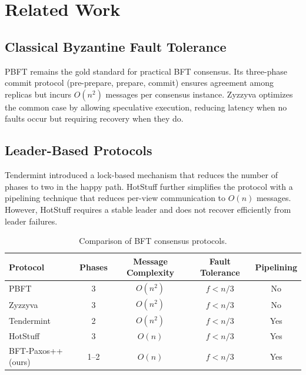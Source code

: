 \documentclass[
    language=english,
    doctype=conference-paper,
    institution=none,
]{../../omnilatex}
\begin{document}
\section{Related Work}
\label{sec:related-work}

\subsection{Classical Byzantine Fault Tolerance}

PBFT \cite{castro1999practical} remains the gold standard for practical BFT consensus.
Its three-phase commit protocol (pre-prepare, prepare, commit) ensures agreement among
replicas but incurs $O(n^2)$ messages per consensus instance. Zyzzyva \cite{kapritsos2012}
optimizes the common case by allowing speculative execution, reducing latency when no faults
occur but requiring recovery when they do.

\subsection{Leader-Based Protocols}

Tendermint \cite{buchman2018tendermint} introduced a lock-based mechanism that reduces
the number of phases to two in the happy path. HotStuff \cite{yin2019hotstuff} further
simplifies the protocol with a pipelining technique that reduces per-view communication
to $O(n)$ messages. However, HotStuff requires a stable leader and does not recover
efficiently from leader failures.

\begin{table}[htbp]
    \centering
    \caption{Comparison of BFT consensus protocols.}
    \label{tab:related-comparison}
    \begin{tabular}{@{}lcccc@{}}
        \toprule
        Protocol         & Phases & Message Complexity & Fault Tolerance & Pipelining \\
        \midrule
        PBFT             & 3      & $O(n^2)$          & $f < n/3$       & No          \\
        Zyzzyva          & 3      & $O(n^2)$          & $f < n/3$       & No          \\
        Tendermint        & 2      & $O(n^2)$          & $f < n/3$       & Yes         \\
        HotStuff         & 3      & $O(n)$            & $f < n/3$       & Yes         \\
        BFT-Paxos++ (ours) & 1--2 & $O(n)$            & $f < n/3$       & Yes         \\
        \bottomrule
    \end{tabular}
\end{table}
\end{document}
